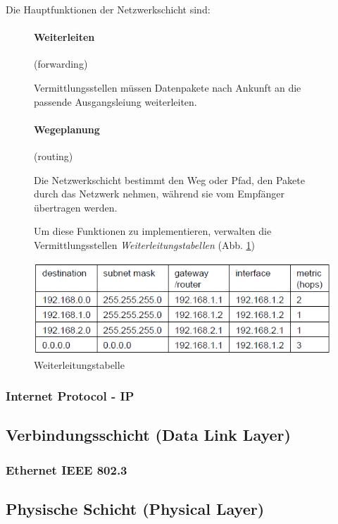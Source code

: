 \documentclass[12pt]{report}
\begin{document}
Die Hauptfunktionen der Netzwerkschicht sind:
\begin{figure}[H]
  \begin{minipage}[t]{0.45\textwidth}
    \paragraph{Weiterleiten} (forwarding)

    Vermittlungsstellen müssen Datenpakete nach Ankunft an die passende Ausgangsleiung weiterleiten.
  \end{minipage}
  \hfill
  \begin{minipage}[t]{0.45\textwidth}
    \paragraph{Wegeplanung} (routing)

    Die Netzwerkschicht bestimmt den Weg oder Pfad, den Pakete durch das Netzwerk nehmen,
    während sie vom Empfänger übertragen werden.
  \end{minipage}
\end{figure}
\begin{figure}[H]
  \begin{minipage}[t]{0.45\textwidth}
    Um diese Funktionen zu implementieren, verwalten die Vermittlungsstellen \textit{Weiterleitungstabellen} (Abb. \ref{fig:weiterleitungstabelle})
  \end{minipage}
  \hfill
  \begin{minipage}[t]{0.45\textwidth}
    \caption{Weiterleitungstabelle}
    \label{fig:weiterleitungstabelle}
    \centering
    \includegraphics[width=\textwidth]{weiterleitungstabelle}
  \end{minipage}
\end{figure}

\subsubsection{Internet Protocol - IP}


\subsection{Verbindungsschicht (Data Link Layer)}
\subsubsection{Ethernet IEEE 802.3}

\subsection{Physische Schicht (Physical Layer)}
\end{document}
